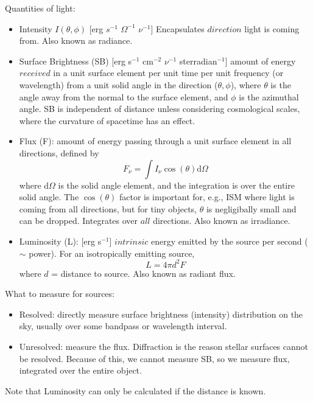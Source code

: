 \documentclass[12pt]{article}
\begin{document}
Quantities of light:
\begin{itemize}
    \item Intensity $I(\theta,\phi)$ [erg $s^{-1}$ $\Omega^{-1}$ $\nu^{-1}$]
        Encapsulates $direction$ light is coming from.
        Also known as radiance.
    \item Surface Brightness (SB)
        [erg s$^{-1}$ cm$^{-2}$ $\nu^{-1}$ sterradian$^{-1}$]
        amount of energy $received$ in a unit surface
        element per unit time per unit frequency (or wavelength) from a unit
        solid angle in the direction ($\theta,\phi$), where $\theta$ is the angle
        away from the normal to the surface element, and $\phi$ is the azimuthal
        angle. SB is independent of distance unless considering cosmological
        scales, where the curvature of spacetime has an effect.
    \item Flux (F): amount of energy passing through a unit surface element
        in all directions, defined by
        \begin{equation}
            F_{\nu} = \int I_{\nu}\cos(\theta)\textrm{d}\Omega
        \end{equation}
        where d$\Omega$ is the solid angle element, and the integration is
        over the entire solid angle. The $\cos(\theta)$ factor is important
        for, e.g., ISM where light is coming from all directions, but for
        tiny objects, $\theta$ is negligibally small and can be dropped.
        Integrates over $all$ directions.
        Also known as irradiance.
    \item Luminosity (L): [erg s$^{-1}$]
        $intrinsic$ energy emitted by the source per
        second ($\sim$ power). For an isotropically emitting source,
        \begin{equation}
            L = 4 \pi d^2 F
        \end{equation}
        where $d$ = distance to source. Also known as radiant flux.
\end{itemize}
What to measure for sources:
\begin{itemize}
    \item Resolved: directly measure surface brightness (intensity)
        distribution on the sky, usually over some bandpass or wavelength
        interval.
    \item Unresolved: measure the flux. Diffraction is the reason stellar
        surfaces cannot be resolved. Because of this, we cannot measure
        SB, so we measure flux, integrated over the entire object.
\end{itemize}
Note that Luminosity can only be calculated if the distance is known.\\
\end{document}
